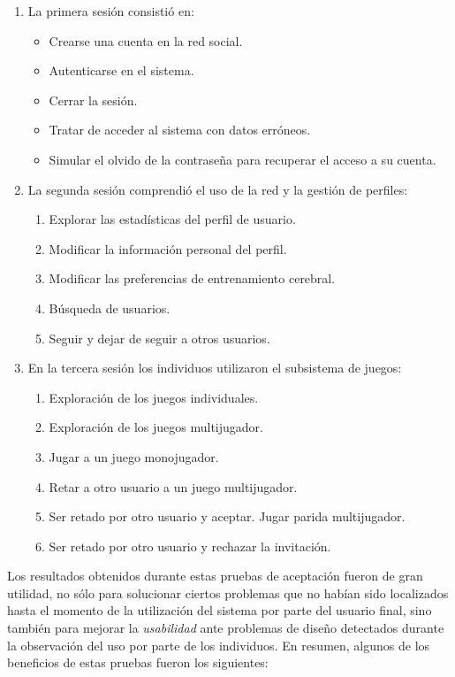 \renewcommand{\labelenumi}{\bf PA-\arabic{enumi}}
\renewcommand{\labelenumii}{\arabic{enumii}. }
\begin{enumerate}
\item La primera sesión consistió en:
  \begin{itemize}
  \item Crearse una cuenta en la red social.
  \item Autenticarse en el sistema.
  \item Cerrar la sesión.
  \item Tratar de acceder al sistema con datos erróneos.
  \item Simular el olvido de la contraseña para recuperar el acceso a su cuenta.
  \end{itemize}

\item La segunda sesión comprendió el uso de la red y la gestión de perfiles:
  \begin{enumerate}
  \item Explorar las estadísticas del perfil de usuario.
  \item Modificar la información personal del perfil.
  \item Modificar las preferencias de entrenamiento cerebral.
  \item Búsqueda de usuarios.
  \item Seguir y dejar de seguir a otros usuarios.
  \end{enumerate}

\item En la tercera sesión los individuos utilizaron el subsistema de juegos: 
  \begin{enumerate}
  \item Exploración de los juegos individuales.
  \item Exploración de los juegos multijugador.
  \item Jugar a un juego monojugador.
  \item Retar a otro usuario a un juego multijugador.
  \item Ser retado por otro usuario y aceptar. Jugar parida multijugador.
  \item Ser retado por otro usuario y rechazar la invitación.
  \end{enumerate}

\end{enumerate}

Los resultados obtenidos durante estas pruebas de aceptación fueron de gran utilidad, no sólo para solucionar ciertos problemas que no habían sido localizados hasta el momento de la utilización del sistema por parte del usuario final, sino también para mejorar la \emph{usabilidad} ante problemas de diseño detectados durante la observación del uso por parte de los individuos. En resumen, algunos de los beneficios de estas pruebas fueron los siguientes:

